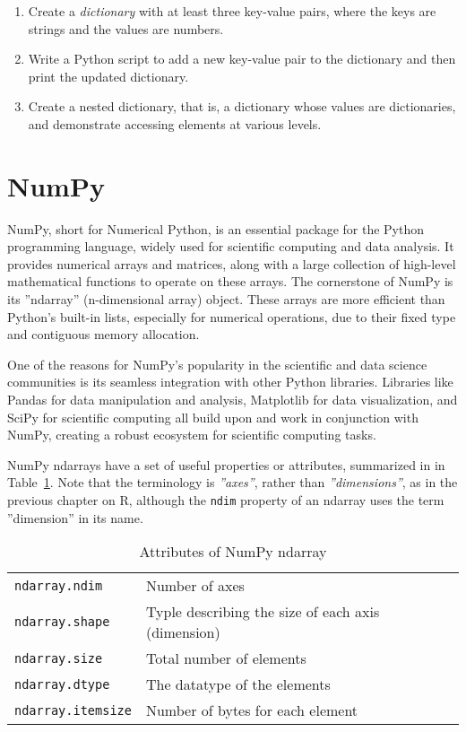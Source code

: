 \begin{exercisebox}
\begin{enumerate}
    \item Create a \emph{dictionary} with at least three key-value pairs, where the keys are strings and the values are numbers.
    \item Write a Python script to add a new key-value pair to the dictionary and then print the updated dictionary.
    \item Create a nested dictionary, that is, a dictionary whose values are dictionaries, and demonstrate accessing elements at various levels.
\end{enumerate}
\end{exercisebox}

\section{NumPy}

NumPy, short for Numerical Python, is an essential package for the Python programming language, widely used for scientific computing and data analysis. It provides numerical arrays and matrices, along with a large collection of high-level mathematical functions to operate on these arrays. The cornerstone of NumPy is its ''ndarray'' (n-dimensional array) object. These arrays are more efficient than Python's built-in lists, especially for numerical operations, due to their fixed type and contiguous memory allocation.

One of the reasons for NumPy's popularity in the scientific and data science communities is its seamless integration with other Python libraries. Libraries like Pandas for data manipulation and analysis, Matplotlib for data visualization, and SciPy for scientific computing all build upon and work in conjunction with NumPy, creating a robust ecosystem for scientific computing tasks.

NumPy ndarrays have a set of useful properties or attributes, summarized in in Table~\ref{tab:numpydatatypes}. Note that the terminology is \emph{''axes''}, rather than \emph{''dimensions''}, as in the previous chapter on R, although the \texttt{ndim} property of an ndarray uses the term ''dimension'' in its name.

\begin{table}
\centering
\renewcommand{\arraystretch}{1.25}
\begin{tabularx}{\linewidth}{l|X} \hline
\texttt{ndarray.ndim} & Number of axes \\
\texttt{ndarray.shape} & Typle describing the size of each axis (dimension)\index{Shape (of array)} \\
\texttt{ndarray.size} & Total number of elements \\
\texttt{ndarray.dtype} & The datatype of the elements \\
\texttt{ndarray.itemsize} & Number of bytes for each element \\ \hline
\end{tabularx}
\caption{Attributes of NumPy ndarray}
\label{tab:numpydatatypes}
\end{table}

